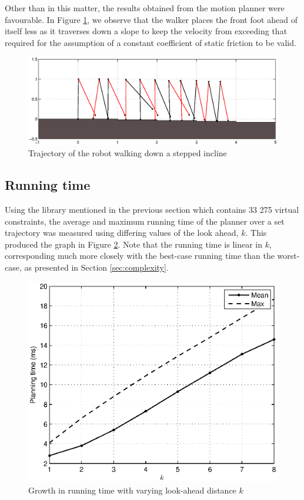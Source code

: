 Other than in this matter, the results obtained from the motion planner were favourable. In Figure \ref{fig:slowdown}, we observe that the walker places the front foot ahead of itself less as it traverses down a slope to keep the velocity from exceeding that required for the assumption of a constant coefficient of static friction to be valid.

\begin{figure}
\centering
\includegraphics[width=\linewidth]{7Results/slowdown}
\caption{Trajectory of the robot walking down a stepped incline}
\label{fig:slowdown}
\end{figure}

\subsection{Running time}
Using the library mentioned in the previous section which contains 33 275 virtual constraints, the average and maximum running time of the planner over a set trajectory was measured using differing values of the look ahead, $k$. This produced the graph in Figure \ref{fig:lookahead}. Note that the running time is linear in $k$, corresponding much more closely with the best-case running time than the worst-case, as presented in Section \ref{sec:complexity}.

\begin{figure}
\centering
\includegraphics[width=0.6\linewidth]{7Results/lookahead}
\caption{Growth in running time with varying look-ahead distance $k$}
\label{fig:lookahead}
\end{figure}

